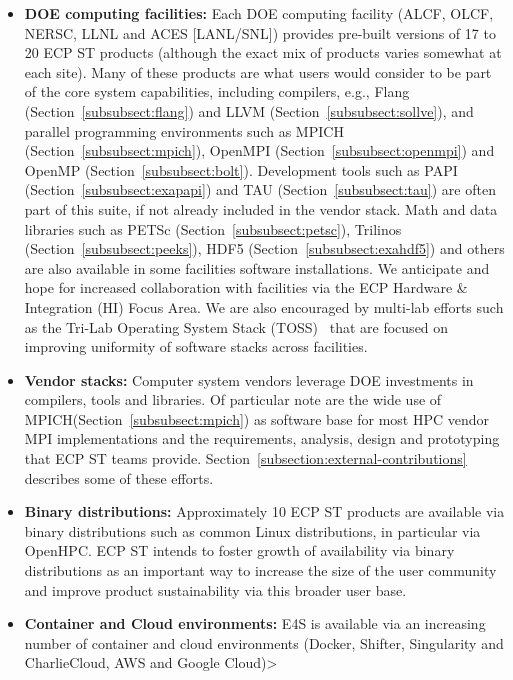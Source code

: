 \begin{itemize}
	\item \textbf{DOE computing facilities:} Each DOE computing facility (ALCF, OLCF, NERSC, LLNL and ACES [LANL/SNL]) provides pre-built versions of 17 to 20 ECP ST products (although the exact mix of products varies somewhat at each site).  Many of these products are what users would consider to be part of the core system capabilities, including compilers, e.g., Flang (Section~\ref{subsubsect:flang}) and LLVM (Section~\ref{subsubsect:sollve}), and parallel programming environments such as MPICH (Section~\ref{subsubsect:mpich}), OpenMPI (Section~\ref{subsubsect:openmpi}) and OpenMP (Section~\ref{subsubsect:bolt}).  Development tools such as PAPI (Section~\ref{subsubsect:exapapi}) and TAU (Section~\ref{subsubsect:tau}) are often part of this suite, if not already included in the vendor stack. Math and data libraries such as PETSc (Section~\ref{subsubsect:petsc}), Trilinos (Section~\ref{subsubsect:peeks}), HDF5 (Section~\ref{subsubsect:exahdf5}) and others are also available in some facilities software installations.  We anticipate and hope for increased collaboration with facilities via the ECP Hardware \& Integration (HI) Focus Area.  We are also encouraged by multi-lab efforts such as the Tri-Lab Operating System Stack (TOSS)~\cite{TOSS} that are focused on improving uniformity of software stacks across facilities.
	\item \textbf{Vendor stacks:} Computer system vendors leverage DOE investments in compilers, tools and libraries.  Of particular note are the wide use of MPICH(Section~\ref{subsubsect:mpich}) as software base for most HPC vendor MPI implementations and the requirements, analysis, design and prototyping that ECP ST teams provide.  Section~\ref{subsection:external-contributions} describes some of these efforts.
	\item \textbf{Binary distributions:} Approximately 10 ECP ST products are available via binary distributions such as common Linux distributions, in particular via OpenHPC\cite{OpenHPC}.  ECP ST intends to foster growth of availability via binary distributions as an important way to increase the size of the user community and improve product sustainability via this broader user base.  
	\item \textbf{Container and Cloud environments:} E4S is available via an increasing number of container  and cloud environments (Docker, Shifter, Singularity and CharlieCloud, AWS and Google Cloud)> 
\end{itemize}

